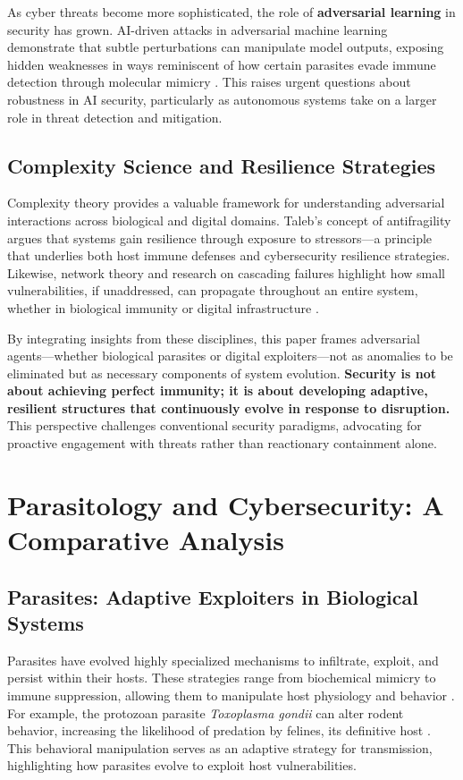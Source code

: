 \documentclass{article}
\begin{document}
As cyber threats become more sophisticated, the role of \textbf{adversarial learning} in security has grown. AI-driven attacks in adversarial machine learning \citep{biggio2018wild} demonstrate that subtle perturbations can manipulate model outputs, exposing hidden weaknesses in ways reminiscent of how certain parasites evade immune detection through molecular mimicry \citep{schmid2014antigenic}. This raises urgent questions about robustness in AI security, particularly as autonomous systems take on a larger role in threat detection and mitigation.

\subsection{Complexity Science and Resilience Strategies}
Complexity theory provides a valuable framework for understanding adversarial interactions across biological and digital domains. Taleb’s concept of antifragility \citep{taleb2012antifragile} argues that systems gain resilience through exposure to stressors—a principle that underlies both host immune defenses and cybersecurity resilience strategies. Likewise, network theory and research on cascading failures highlight how small vulnerabilities, if unaddressed, can propagate throughout an entire system, whether in biological immunity or digital infrastructure \citep{barabasi2016network}.

By integrating insights from these disciplines, this paper frames adversarial agents—whether biological parasites or digital exploiters—not as anomalies to be eliminated but as necessary components of system evolution. \textbf{Security is not about achieving perfect immunity; it is about developing adaptive, resilient structures that continuously evolve in response to disruption.} This perspective challenges conventional security paradigms, advocating for proactive engagement with threats rather than reactionary containment alone.

\section{Parasitology and Cybersecurity: A Comparative Analysis}
\subsection{Parasites: Adaptive Exploiters in Biological Systems}
Parasites have evolved highly specialized mechanisms to infiltrate, exploit, and persist within their hosts. These strategies range from biochemical mimicry to immune suppression, allowing them to manipulate host physiology and behavior \citep{schmid2014antigenic}. For example, the protozoan parasite \textit{Toxoplasma gondii} can alter rodent behavior, increasing the likelihood of predation by felines, its definitive host \citep{dobson1989population}. This behavioral manipulation serves as an adaptive strategy for transmission, highlighting how parasites evolve to exploit host vulnerabilities.
\end{document}
